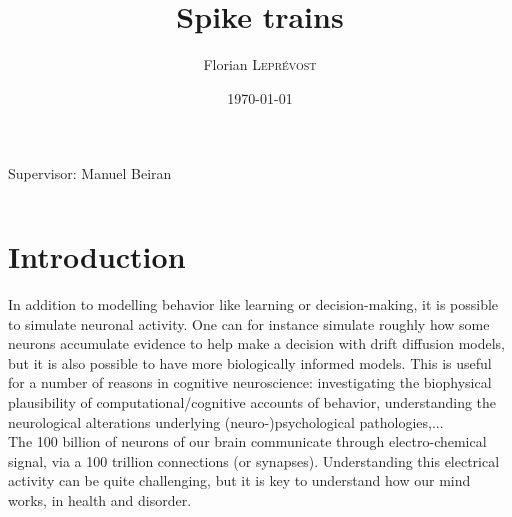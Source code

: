 \documentclass{article}
\title{Spike trains} %
\author{Florian \textsc{Leprévost}} %
\date{\today} %
\begin{document}
\maketitle %

\noindent Supervisor: Manuel Beiran %
\tableofcontents

\begin{center}
\begin{tabular}{l r}

\end{tabular}
\end{center}


\section{Introduction}\label{introduction}

\indent\indent In addition to modelling behavior like learning or decision-making, it is possible to simulate neuronal activity. One can for instance simulate roughly how some neurons accumulate evidence to help make a decision with drift diffusion models, but it is also possible to have more biologically informed models. This is useful for a number of reasons in cognitive neuroscience: investigating the biophysical plausibility of computational/cognitive accounts of behavior, understanding the neurological alterations underlying (neuro-)psychological pathologies,... \\
\indent The 100 billion of neurons of our brain communicate through electro-chemical signal, via a 100 trillion connections (or synapses). Understanding this electrical activity can be quite challenging, but it is key to understand how our mind works, in health and disorder.\\
\end{document}
